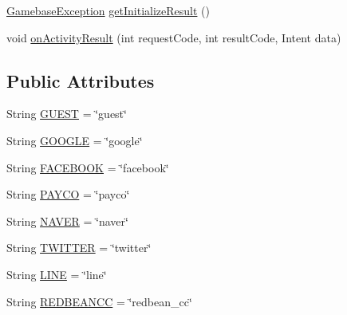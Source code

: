 \begin{DoxyCompactItemize}
\item 
\hyperlink{classcom_1_1toast_1_1android_1_1gamebase_1_1base_1_1_gamebase_exception}{Gamebase\+Exception} \hyperlink{interfacecom_1_1toast_1_1android_1_1gamebase_1_1base_1_1auth_1_1_auth_provider_a8a1ab1442c58755e8aa5d6951f145aa4}{get\+Initialize\+Result} ()
\item 
void \hyperlink{interfacecom_1_1toast_1_1android_1_1gamebase_1_1base_1_1auth_1_1_auth_provider_a3bc85abb35d480f743e4b74d5de3d549}{on\+Activity\+Result} (int request\+Code, int result\+Code, Intent data)
\end{DoxyCompactItemize}
\subsection*{Public Attributes}
\begin{DoxyCompactItemize}
\item 
String \hyperlink{interfacecom_1_1toast_1_1android_1_1gamebase_1_1base_1_1auth_1_1_auth_provider_a6998387a5bcf6eb325dc904c37145dab}{G\+U\+E\+ST} = \char`\"{}guest\char`\"{}
\item 
String \hyperlink{interfacecom_1_1toast_1_1android_1_1gamebase_1_1base_1_1auth_1_1_auth_provider_a883b55b18d872eb84baeea2c11d66f0c}{G\+O\+O\+G\+LE} = \char`\"{}google\char`\"{}
\item 
String \hyperlink{interfacecom_1_1toast_1_1android_1_1gamebase_1_1base_1_1auth_1_1_auth_provider_a14dba169d99a21878be53600c0ee5601}{F\+A\+C\+E\+B\+O\+OK} = \char`\"{}facebook\char`\"{}
\item 
String \hyperlink{interfacecom_1_1toast_1_1android_1_1gamebase_1_1base_1_1auth_1_1_auth_provider_a7b1333471ca001d6e939ffbbfb579aff}{P\+A\+Y\+CO} = \char`\"{}payco\char`\"{}
\item 
String \hyperlink{interfacecom_1_1toast_1_1android_1_1gamebase_1_1base_1_1auth_1_1_auth_provider_a67a475a334d6c43c274a26e4828a4dfa}{N\+A\+V\+ER} = \char`\"{}naver\char`\"{}
\item 
String \hyperlink{interfacecom_1_1toast_1_1android_1_1gamebase_1_1base_1_1auth_1_1_auth_provider_ac6383becc353f32afe71ffa0a88dda23}{T\+W\+I\+T\+T\+ER} = \char`\"{}twitter\char`\"{}
\item 
String \hyperlink{interfacecom_1_1toast_1_1android_1_1gamebase_1_1base_1_1auth_1_1_auth_provider_a948aa259d3cb643c3e9922f76e3f96b1}{L\+I\+NE} = \char`\"{}line\char`\"{}
\item 
String \hyperlink{interfacecom_1_1toast_1_1android_1_1gamebase_1_1base_1_1auth_1_1_auth_provider_a1a0c3c154d97ba63bc3bd338e4368834}{R\+E\+D\+B\+E\+A\+N\+CC} = \char`\"{}redbean\+\_\+cc\char`\"{}
\end{DoxyCompactItemize}


